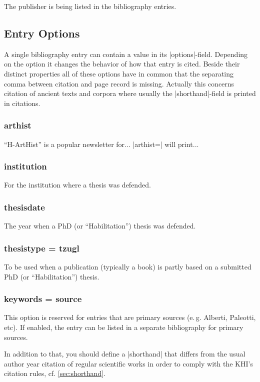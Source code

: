 \documentclass[a4paper,
10pt,
ngerman,
english
]{ltxdoc}
\begin{document}
The publisher is being listed in the bibliography entries.


\subsection{Entry Options}
A single bibliography entry can contain a value in its |options|-field.
Depending on the option it changes the behavior of how that entry is cited.
Beside their distinct properties all of these options have in common that the separating comma between citation and page record is missing. 
Actually this concerns citation of ancient texts and corpora where usually the |shorthand|-field is printed in citations.

\subsubsection{arthist}
\enquote{H-ArtHist} is a popular newsletter for... %
|arthist=| will print...

\subsubsection{institution}
For the institution where a thesis was defended.

\subsubsection{thesisdate}
The year when a PhD (or \enquote{Habilitation}) thesis was defended.

\subsubsection{thesistype = tzugl}
To be used when a publication (typically a book) is partly based on a submitted PhD (or \enquote{Habilitation}) thesis.

\subsubsection{keywords = source}\label{sec:source}
This option is reserved for entries that are primary sources (e.\,g. Alberti, Paleotti, etc). %
If enabled, the entry can be listed in a separate bibliography for primary sources.

In addition to that, you should define a |shorthand| that differs from the usual author year citation of regular scientific works in order to comply with the KHI's citation rules, cf. \cref{sec:shorthand}.
\end{document}

